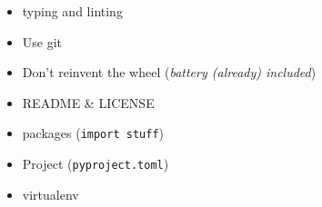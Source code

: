 \documentclass[10pt,
aspectratio=169
]{beamer}
\begin{document}
 \begin{frame}
 	\begin{itemize}
 		\item typing and linting
 		\item Use git
 		\item Don't reinvent the wheel (\textit{battery (already) included})
 		\item README \& LICENSE
 		\item packages (\texttt{import stuff})
 		\item Project (\texttt{pyproject.toml})
 		\item virtualenv
 	\end{itemize}
 \end{frame}
\end{document}
